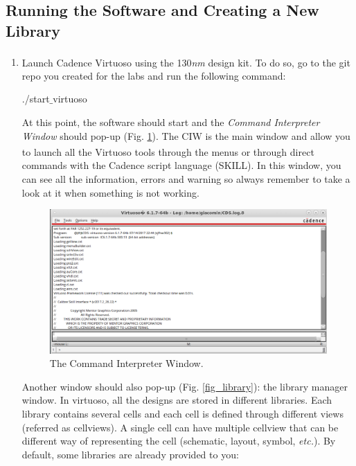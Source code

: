 \subsection{Running the Software and Creating a New Library}
\begin{enumerate}
	\item Launch Cadence Virtuoso\textsuperscript{\tiny\textregistered} using the 130\emph{nm} design kit. To do so, go to the git repo you created for the labs and run the following command:
\begin{codeline}
./start$\_$virtuoso
\end{codeline}
	
	At this point, the software should start and the \textit{Command Interpreter Window} should pop-up (Fig. \ref{fig_ciw}). The CIW is the main window and allow you to launch all the Virtuoso\textsuperscript{\tiny\textregistered} tools through the menus or through direct commands with the Cadence script language (SKILL). In this window, you can see all the information, errors and warning so always remember to take a look at it when something is not working.
	
	\begin{figure}[!h]
		\centering
		\includegraphics[scale=0.37]{figures/lab1_schematic_sim/ciw}
		\caption{The Command Interpreter Window.}
		\label{fig_ciw}
	\end{figure}
	
	Another window should also pop-up (Fig. \ref{fig_library}): the library manager window. In virtuoso, all the designs are stored in different libraries. Each library contains several cells and each cell is defined through different views (referred as cellviews). A single cell can have multiple cellview that can be different way of representing the cell (schematic, layout, symbol, \textit{etc.}). By default, some libraries are already provided to you: 
	

\end{enumerate}
